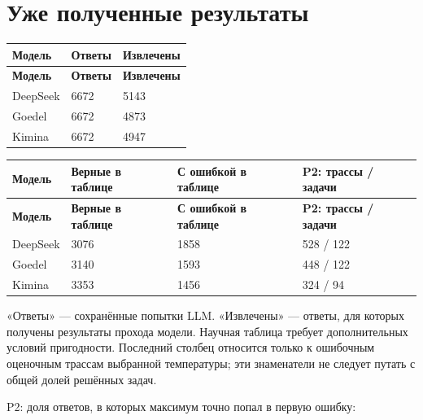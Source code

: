 \documentclass[11pt,a4paper]{article}
\begin{document}
\section{Уже полученные результаты}
\begingroup\fontsize{9.3}{12}\selectfont
\begin{longtable}{@{}P{31.09mm}P{62.18mm}P{62.18mm}@{}}
\toprule
\textbf{Модель} & \textbf{Ответы} & \textbf{Извлечены} \\
\midrule
\endfirsthead
\toprule
\textbf{Модель} & \textbf{Ответы} & \textbf{Извлечены} \\
\midrule
\endhead
\bottomrule
\endfoot
DeepSeek & 6672 & 5143 \\[3pt]
Goedel & 6672 & 4873 \\[3pt]
Kimina & 6672 & 4947 \\[3pt]
\end{longtable}
\endgroup
\begingroup\fontsize{9.3}{12}\selectfont
\begin{longtable}{@{}P{24.31mm}P{41.02mm}P{41.02mm}P{45.58mm}@{}}
\toprule
\textbf{Модель} & \textbf{Верные в таблице} & \textbf{С ошибкой в таблице} & \textbf{P2: трассы / задачи} \\
\midrule
\endfirsthead
\toprule
\textbf{Модель} & \textbf{Верные в таблице} & \textbf{С ошибкой в таблице} & \textbf{P2: трассы / задачи} \\
\midrule
\endhead
\bottomrule
\endfoot
DeepSeek & 3076 & 1858 & 528 / 122 \\[3pt]
Goedel & 3140 & 1593 & 448 / 122 \\[3pt]
Kimina & 3353 & 1456 & 324 / 94 \\[3pt]
\end{longtable}
\endgroup
«Ответы» — сохранённые попытки LLM. «Извлечены» — ответы, для которых получены результаты прохода модели. Научная таблица требует дополнительных условий пригодности. Последний столбец относится только к ошибочным оценочным трассам выбранной температуры; эти знаменатели не следует путать с общей долей решённых задач.

P2: доля ответов, в которых максимум точно попал в первую ошибку:
\end{document}
